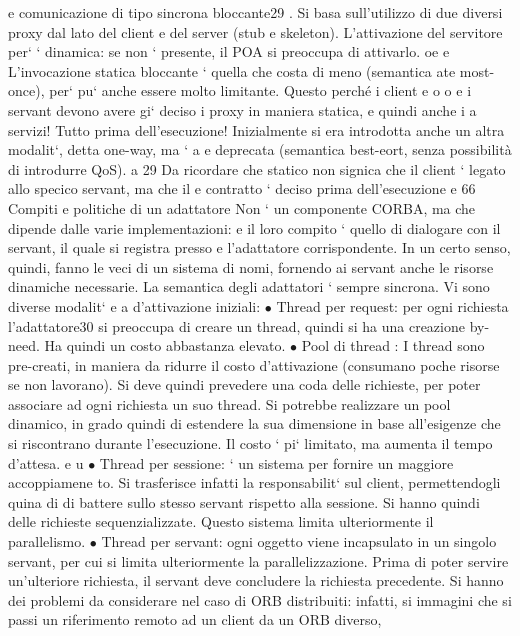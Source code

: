 \documentclass[a4paper,12pt]{article}
\begin{document}
e
comunicazione di tipo sincrona bloccante29 . Si basa sull'utilizzo di due diversi
proxy dal lato del client e del server (stub e skeleton). L'attivazione del servitore
per` ` dinamica: se non ` presente, il POA si preoccupa di attivarlo.
oe
e
L'invocazione statica bloccante ` quella che costa di meno (semantica ate
most-once), per` pu` anche essere molto limitante. Questo perché i client e
o
o
e
i servant devono avere gi` deciso i proxy in maniera statica, e quindi anche i
a
servizi! Tutto prima dell'esecuzione!
Inizialmente si era introdotta anche un altra modalit`, detta one-way, ma `
a
e
deprecata (semantica best-eort, senza possibilità di introdurre QoS).
a
29 Da ricordare che statico non signica che il client ` legato allo specico servant, ma che il
e
contratto ` deciso prima dell'esecuzione
e
66
Compiti e politiche di un adattatore
Non ` un componente CORBA, ma che dipende dalle varie implementazioni:
e
il loro compito ` quello di dialogare con il servant, il quale si registra presso
e
l'adattatore corrispondente. In un certo senso, quindi, fanno le veci di un sistema
di nomi, fornendo ai servant anche le risorse dinamiche necessarie.
La semantica degli adattatori ` sempre sincrona. Vi sono diverse modalit`
e
a
d'attivazione iniziali:
$\bullet$ Thread per request: per ogni richiesta l'adattatore30 si preoccupa di creare
un thread, quindi si ha una creazione by-need. Ha quindi un costo abbastanza elevato.
$\bullet$ Pool di thread : I thread sono pre-creati, in maniera da ridurre il costo
d'attivazione (consumano poche risorse se non lavorano). Si deve quindi
prevedere una coda delle richieste, per poter associare ad ogni richiesta un
suo thread.
Si potrebbe realizzare un pool dinamico, in grado quindi di estendere la
sua dimensione in base all'esigenze che si riscontrano durante l'esecuzione.
Il costo ` pi` limitato, ma aumenta il tempo d'attesa.
e u
$\bullet$ Thread per sessione: ` un sistema per fornire un maggiore accoppiamene
to. Si trasferisce infatti la responsabilit` sul client, permettendogli quina
di di battere sullo stesso servant rispetto alla sessione. Si hanno quindi delle richieste sequenzializzate. Questo
sistema limita ulteriormente il
parallelismo.
$\bullet$ Thread per servant: ogni oggetto viene incapsulato in un singolo servant,
per cui si limita ulteriormente la parallelizzazione. Prima di poter servire
un'ulteriore richiesta, il servant deve concludere la richiesta precedente.
Si hanno dei problemi da considerare nel caso di ORB distribuiti: infatti, si
immagini che si passi un riferimento remoto ad un client da un ORB diverso,
\end{document}
